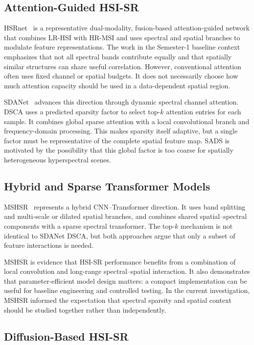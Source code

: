 \documentclass[10pt,twocolumn,letterpaper]{article}
\begin{document}
\subsection{Attention-Guided HSI-SR}

HSRnet~\cite{hu2022hsrnet} is a representative dual-modality, fusion-based attention-guided network that combines LR-HSI with HR-MSI and uses spectral and spatial branches to modulate feature representations. The work in the Semester-1 baseline context emphasizes that not all spectral bands contribute equally and that spatially similar structures can share useful correlation. However, conventional attention often uses fixed channel or spatial budgets. It does not necessarily choose how much attention capacity should be used in a data-dependent spatial region.

SDANet~\cite{wang2026sdanet} advances this direction through dynamic spectral channel attention. DSCA uses a predicted sparsity factor to select top-$k$ attention entries for each sample. It combines global sparse attention with a local convolutional branch and frequency-domain processing. This makes sparsity itself adaptive, but a single factor must be representative of the complete spatial feature map. SADS is motivated by the possibility that this global factor is too coarse for spatially heterogeneous hyperspectral scenes.

\subsection{Hybrid and Sparse Transformer Models}

MSHSR~\cite{zhang2025mshsr} represents a hybrid CNN--Transformer direction. It uses band splitting and multi-scale or dilated spatial branches, and combines shared spatial--spectral components with a sparse spectral transformer. The top-$k$ mechanism is not identical to SDANet DSCA, but both approaches argue that only a subset of feature interactions is needed.

MSHSR is evidence that HSI-SR performance benefits from a combination of local convolution and long-range spectral--spatial interaction. It also demonstrates that parameter-efficient model design matters: a compact implementation can be useful for baseline engineering and controlled testing. In the current investigation, MSHSR informed the expectation that spectral sparsity and spatial context should be studied together rather than independently.

\subsection{Diffusion-Based HSI-SR}
\end{document}
